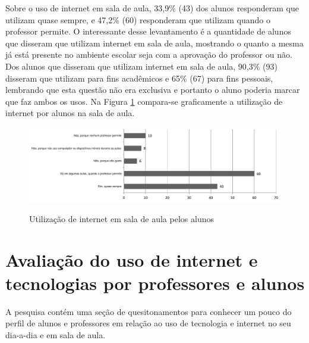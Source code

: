 Sobre o uso de internet em sala de aula, 33,9\% (43) dos alunos responderam que utilizam quase sempre, e 47,2\% (60) responderam que utilizam quando o professor permite. O interessante desse levantamento é a quantidade de alunos que disseram que utilizam internet em sala de aula, mostrando o quanto a mesma já está presente no ambiente escolar seja com a aprovação do professor ou não. Dos alunos que disseram que utilizam internet em sala de aula, 90,3\% (93) disseram que utilizam para fins acadêmicos e 65\% (67) para fins pessoais, lembrando que esta questão não era exclusiva e portanto o aluno poderia marcar que faz ambos os usos. Na Figura \ref{fig:grafico_uso_internet_alunos_sala} compara-se graficamente a utilização de internet por alunos na sala de aula.

\begin{figure}[!h]
\centering
\caption{Utilização de internet em sala de aula pelos alunos}
\includegraphics[width=1.0\textwidth]{pdfs/alunos-professores/pesquisa-alunos-uso-internet-sala.pdf} 
\label{fig:grafico_uso_internet_alunos_sala} 
\end{figure}




\section{Avaliação do uso de internet e tecnologias por professores e alunos}

A pesquisa contém uma seção de quesitonamentos para conhecer um pouco do perfil de alunos e professores em relação ao uso de tecnologia e internet no seu dia-a-dia e em sala de aula. 

